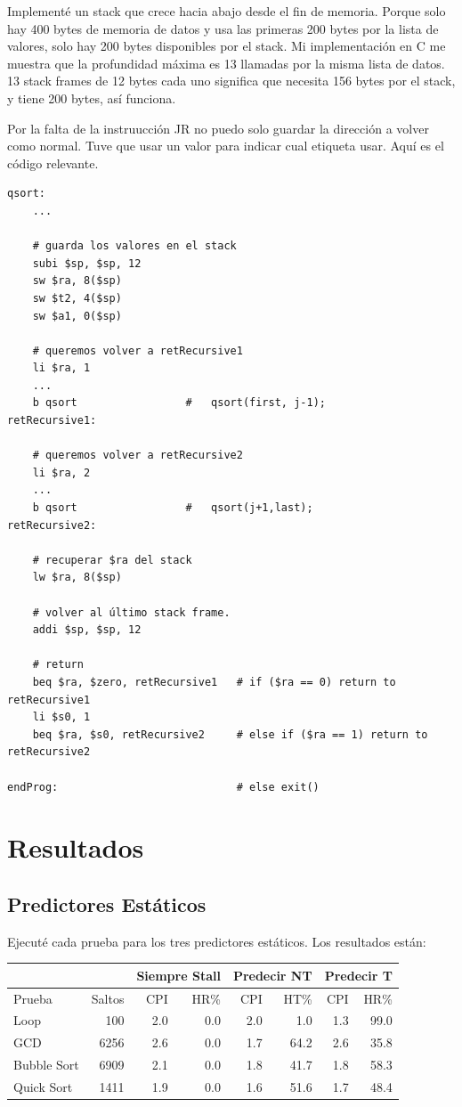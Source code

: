 \documentclass[a4paper]{article}
\begin{document}
Implementé un stack que crece hacia abajo desde el fin de memoria. Porque solo hay 400 bytes de memoria de datos y usa las primeras 200 bytes por la lista de valores, solo hay 200 bytes disponibles por el stack. Mi implementación en C me muestra que la profundidad máxima es 13 llamadas por la misma lista de datos. 13 stack frames de 12 bytes cada uno significa que necesita 156 bytes por el stack, y tiene 200 bytes, así funciona.

Por la falta de la instruucción JR no puedo solo guardar la dirección a volver como normal. Tuve que usar un valor para indicar cual etiqueta usar. Aquí es el código relevante.

\begin{verbatim}
qsort:
    ...

    # guarda los valores en el stack
    subi $sp, $sp, 12
    sw $ra, 8($sp)
    sw $t2, 4($sp)
    sw $a1, 0($sp)

    # queremos volver a retRecursive1
    li $ra, 1
    ...
    b qsort                 #   qsort(first, j-1);
retRecursive1:

    # queremos volver a retRecursive2
    li $ra, 2
    ...
    b qsort                 #   qsort(j+1,last);
retRecursive2:

    # recuperar $ra del stack
    lw $ra, 8($sp)

    # volver al último stack frame.
    addi $sp, $sp, 12

    # return
    beq $ra, $zero, retRecursive1   # if ($ra == 0) return to retRecursive1
    li $s0, 1
    beq $ra, $s0, retRecursive2     # else if ($ra == 1) return to retRecursive2

endProg:                            # else exit()
\end{verbatim}

\section{Resultados}

\subsection{Predictores Estáticos}

Ejecuté cada prueba para los tres predictores estáticos. Los resultados están:

\begin{tabular}{| l | r |  r r | r r | r r | }
\cline{3-8}
\multicolumn{2}{c|}{} & \multicolumn{2}{c|}{Siempre Stall} & \multicolumn{2}{c|}{Predecir NT} & \multicolumn{2}{c|}{Predecir T} \\ \hline
Prueba &  Saltos & CPI & HR\% & CPI & HT\% & CPI & HR\% \\ \hline
Loop        & 100  & 2.0 & 0.0 & 2.0 & 1.0  & 1.3 & 99.0 \\
GCD         & 6256 & 2.6 & 0.0 & 1.7 & 64.2 & 2.6 & 35.8 \\
Bubble Sort & 6909 & 2.1 & 0.0 & 1.8 & 41.7 & 1.8 & 58.3 \\
Quick Sort  & 1411 & 1.9 & 0.0 & 1.6 & 51.6 & 1.7 & 48.4 \\
\hline
\end{tabular}
\end{document}
